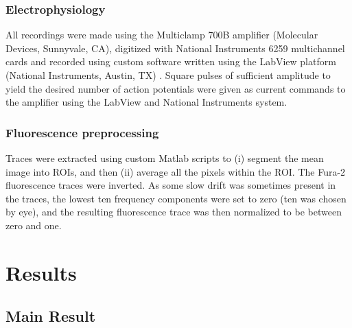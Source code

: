 \subsubsection{Electrophysiology}

All recordings were made using the Multiclamp 700B amplifier (Molecular Devices, Sunnyvale, CA), digitized with National Instruments 6259 multichannel cards and recorded using custom software written using the LabView platform (National Instruments, Austin, TX) .  Square pulses of sufficient amplitude to yield the desired number of action potentials were given as current commands to the amplifier using the LabView and National Instruments system.

\subsubsection{Fluorescence preprocessing}

Traces were extracted using custom Matlab scripts to (i) segment the mean image into ROIs, and then (ii) average all the pixels within the ROI.  The Fura-2 fluorescence traces were inverted.  As some slow drift was sometimes present in the traces, the lowest ten frequency components were set to zero (ten was chosen by eye), and the resulting fluorescence trace was then normalized to be between zero and one.









\section{Results} \label{sec:results}

\subsection{Main Result} \label{sec:main}

